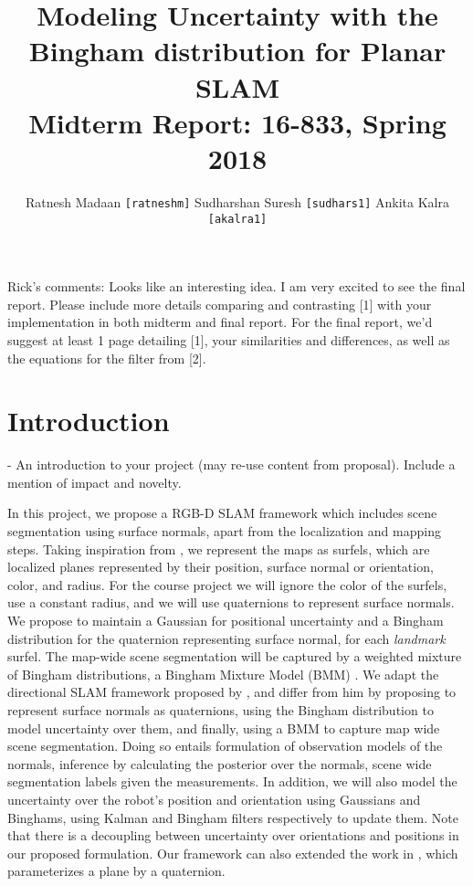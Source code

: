 \documentclass[12pt]{article}
\title{%
	Modeling Uncertainty with the Bingham distribution for Planar SLAM \\
  \large Midterm Report: 16-833, Spring 2018}
\author{\small{Ratnesh Madaan \texttt{[ratneshm]} \qquad Sudharshan Suresh \texttt{[sudhars1]} \qquad  Ankita Kalra \texttt{[akalra1]}}}
\date{}
\begin{document}
\maketitle

\raggedright
\justify

\vspace{-2em}

\begin{spverbatim}
Rick's comments: Looks like an interesting idea.  I am very excited to see the final report. Please include more details comparing and contrasting [1] with your implementation in both midterm and final report.  For the final report, we'd suggest at least 1 page detailing [1], your similarities and differences, as well as the equations for the filter from [2].
\end{spverbatim}

\section{Introduction}
- An introduction to your project (may re-use content from proposal).  Include a mention of impact and novelty.

\label{sec:abstract}
In this project, we propose a RGB-D SLAM framework which includes scene segmentation using surface normals, apart from the localization and mapping steps. 
Taking inspiration from \cite{straub}, we represent the maps as surfels, which are localized planes represented by their position, surface normal or orientation, color, and radius. 
For the course project we will ignore the color of the surfels, use a constant radius, and we will use quaternions to represent surface normals. 
We propose to maintain a Gaussian for positional uncertainty and a Bingham distribution for the quaternion representing surface normal, for each \textit{landmark} surfel.
The map-wide scene segmentation will be captured by a weighted mixture of Bingham distributions, a Bingham Mixture Model (BMM) \cite{glover_bmm}.
We adapt the directional SLAM framework proposed by \cite{straub}, and differ from him by proposing to represent surface normals as quaternions, using the Bingham distribution \cite{glover} to model uncertainty over them, and finally, using a BMM to capture map wide scene segmentation. 
Doing so entails formulation of observation models of the normals, inference by calculating the posterior over the normals, scene wide segmentation labels given the measurements.
In addition, we will also model the uncertainty over the robot's position and orientation using Gaussians and Binghams, using Kalman and Bingham filters \cite{glover} respectively to update them. 
Note that there is a decoupling between uncertainty over orientations and positions in our proposed formulation. Our framework can also extended the work in \cite{kaess}, which parameterizes a plane by a quaternion. 
\end{document}
